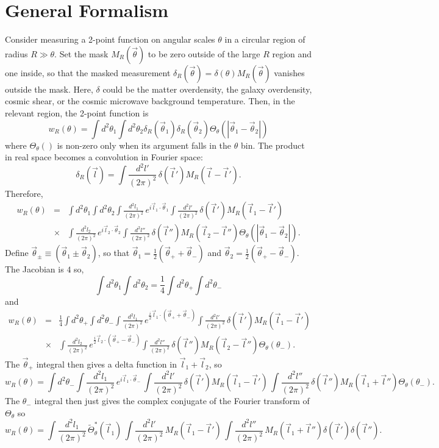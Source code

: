 \documentclass[prd,amsmath,amssymb,floatfix,superscriptaddress,nofootinbib]{revtex4-1}
\def\be{\begin{equation}}
\def\ee{\end{equation}}
\def\bea{\begin{eqnarray}}
\def\eea{\end{eqnarray}}
\newcommand{\vs}{\nonumber\\}
\begin{document}
\section{General Formalism}
Consider measuring a 2-point function on angular scales $\theta$ in a circular region of radius $R\gg\theta$. Set the mask $M_R(\vec\theta)$ to be zero outside of the large $R$ region and one inside, so that the masked measurement $\delta_R(\vec\theta) = \delta(\theta)M_R(\vec\theta)$ vanishes outside the mask. 
Here, $\delta$ could be the matter overdensity, the galaxy overdensity, cosmic shear, or the cosmic microwave background temperature.
Then, in the relevant region, the 2-point function is
\be
w_R(\theta)= \int d^2\theta_1 \int d^2\theta_2 \delta_R(\vec\theta_1) \delta_R(\vec\theta_2) \Theta_\theta(|\vec\theta_1-\vec\theta_2|)
\ee
where $\Theta_\theta()$ is non-zero only when its argument falls in the $\theta$ bin.
The product in real space becomes a convolution in Fourier space:
\be
\delta_R(\vec l) = \int \frac{d^2l'}{(2\pi)^2}\, \delta(\vec l') M_R(\vec l-\vec l') 
.\ee
Therefore,
\bea
w_R(\theta) &=& \int d^2\theta_1 \int d^2\theta_2 \int \frac{d^2l_1}{(2\pi)^2}\, e^{i\vec l_1\cdot \vec\theta_1}\int \frac{d^2l'}{(2\pi)^2}\, \delta(\vec l') M_R(\vec l_1-\vec l') 
\vs
&\times&
\int \frac{d^2l_2}{(2\pi)^2}\, e^{i\vec l_2\cdot \vec\theta_2}\int \frac{d^2l''}{(2\pi)^2}\, \delta(\vec l'') M_R(\vec l_2-\vec l'') 
 \Theta_\theta(|\vec\theta_1-\vec\theta_2|).
\eea
Define $\vec\theta_\pm \equiv (\vec\theta_1\pm\vec\theta_2)$, so that $\vec\theta_1=\frac12(\vec\theta_++\vec\theta_-)$ and $\vec\theta_2=\frac12(\vec\theta_+-\vec\theta_-)$. The Jacobian is $4$ so,
\be
 \int d^2\theta_1 \int d^2\theta_2  =  \frac14\int d^2\theta_+ \int d^2\theta_- 
\ee
and
\bea
w_R(\theta) &=& \frac14\int d^2\theta_+ \int d^2\theta_- \int \frac{d^2l_1}{(2\pi)^2}\, e^{\frac{i}2\vec l_1\cdot (\vec\theta_++\vec\theta_-)}\int \frac{d^2l'}{(2\pi)^2}\, \delta(\vec l') M_R(\vec l_1-\vec l') 
\vs
&\times&
\int \frac{d^2l_2}{(2\pi)^2}\, e^{\frac{i}2\vec l_2\cdot (\vec\theta_+-\vec\theta_-)}\int \frac{d^2l''}{(2\pi)^2}\, \delta(\vec l'') M_R(\vec l_2-\vec l'') 
 \Theta_\theta(\theta_-).
\eea
The $\vec\theta_+$ integral then gives a delta function in $\vec l_1+\vec l_2$, so
\be
w_R(\theta) =  \int d^2\theta_- \int \frac{d^2l_1}{(2\pi)^2}\, e^{i\vec l_1\cdot\vec\theta_-}\, \int \frac{d^2l'}{(2\pi)^2}\, \delta(\vec l') M_R(\vec l_1-\vec l') 
\,\int \frac{d^2l''}{(2\pi)^2}\, \delta(\vec l'') M_R(\vec l_1+\vec l'') 
 \Theta_\theta(\theta_-).
\ee
The $\theta_-$ integral then just gives the complex conjugate of the Fourier transform of $\Theta_\theta$ so
\be
w_R(\theta) =  \int \frac{d^2l_1}{(2\pi)^2}\, \tilde \Theta_\theta^*(\vec l_1)\, \int \frac{d^2l'}{(2\pi)^2}\, M_R(\vec l_1-\vec l') 
\,\int \frac{d^2l''}{(2\pi)^2}\, M_R(\vec l_1+\vec l'') \delta(\vec l') \delta(\vec l'') 
.
\ee
\end{document}
